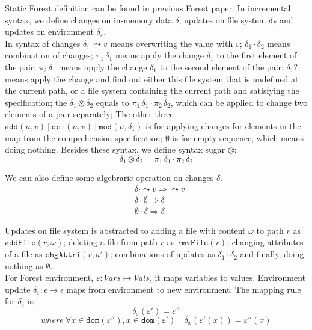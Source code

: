\documentclass[10pt,twoside,a4paper]{article}
\theoremstyle{theorem}
\theoremstyle{lemma}
\theoremstyle{property}
\theoremstyle{definition}
\theoremstyle{assumption}
\def\fst{\pi_1}
\def\snd{\pi_2}
\begin{document}
Static Forest definition can be found in previous Forest paper. In incremental syntax, we define changes on in-memory data $\delta$, updates on file system $\delta_F$ and updates on environment $\delta_\varepsilon$. \\

In syntax of changes $\delta$, $\leadsto v$ means overwriting the value with $v$; 
$\delta_1 \cdot \delta_2$ means combination of changes; 
$\fst\,\delta_1$ means apply the change $\delta_1$ to the first element of the pair, $\snd\,\delta_1$ means apply the change $\delta_1$ to the second element of the pair; 
$\delta_1?$ means apply the change and find out either this file system that is undefined at the current path, or a file system containing the current path and satisfying the specification; 
the $\delta_1 \otimes \delta_2$ equals to $\fst\,\delta_1 \cdot \snd\,\delta_2$, which can be applied to change two elements of a pair separately; 
The other three $\mathtt{add}(n, v) ~|~ \mathtt{del}(n, v) ~|~ \mathtt{mod}(n, \delta_1)$ is for applying changes for elements in the map from the comprehension specification; 
$\emptyset$ is for empty sequence, which means doing nothing. Besides these syntax, we define syntax sugar $\otimes$:
\begin{displaymath}
\delta_1 \otimes \delta_2 = \fst\,\delta_1 \cdot \snd\,\delta_2
\end{displaymath}

We can also define some algebraric operation on changes $\delta$.
\begin{align*}
	& \delta \cdot \leadsto v \Rightarrow \leadsto v \\
	& \delta \cdot \emptyset \Rightarrow \delta \\
	& \emptyset \cdot \delta \Rightarrow \delta
\end{align*}

Updates on file system is abstracted to adding a file with content $\omega$ to path $r$ as $\mathtt{addFile}(r,\omega)$; deleting a file from path $r$ as $\mathtt{rmvFile}(r)$; changing attributes of a file as $\mathtt{chgAttri}(r,a')$; combinations of updates as $\delta_1 \cdot \delta_2$ and finally, doing nothing as $\emptyset$.\\

For Forest environment, $\varepsilon: V\!ars \mapsto V\!als$, it maps variables to values. Environment update $\delta_\varepsilon: \epsilon \mapsto \epsilon$ maps from environment to new environment. The mapping rule for $\delta_\varepsilon$ is:
\begin{displaymath}
	\delta_\varepsilon(\varepsilon') = \varepsilon''
\end{displaymath}
\begin{displaymath}
	where ~\forall x \in \mathtt{dom}(\varepsilon''), x \in \mathtt{dom}(\varepsilon') \quad \delta_x(\varepsilon'(x)) = \varepsilon''(x)
\end{displaymath}
\end{document}
